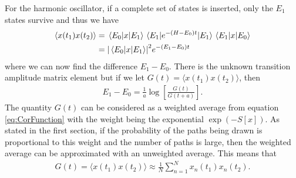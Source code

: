 \documentclass[11pt]{article}
\begin{document}
For the harmonic oscillator, if a complete set of states is inserted, only the $E_1$ states survive and thus we have
\begin{align}
	\langle x(t_1)x(t_2)\rangle&=\mel{E_0}{x}{E_1}\mel{E_1}{e^{-(H-E_0)t}}{E_1}\mel{E_1}{x}{E_0}\\
	&=\abs{\mel{E_0}{x}{E_1}}^2e^{-(E_1-E_0)t}
\end{align}
where we can now find the difference $E_1-E_0$. There is the unknown transition amplitude matrix element but if we let $G(t)=\langle x(t_1)x(t_2)\rangle$, then
\begin{align}
	E_1-E_0=\frac{1}{a}\log\left[\frac{G(t)}{G(t+a)}\right].
	\label{eq:ExciteE}
\end{align}
The quantity $G(t)$ can be considered as a weighted average from equation \ref{eq:CorFunction} with the weight being the exponential $\exp(-S[x])$. As stated in the first section, if the probability of the paths being drawn is proportional to this weight and the number of paths is large, then the weighted average can be approximated with an unweighted average. This means that
\begin{align}
	G(t)=\langle x(t_1)x(t_2)\rangle\approx\frac{1}{N}\sum_{n=1}^Nx_n(t_1)x_n(t_2).
	\label{eq:GApprox}
\end{align}
\end{document}
